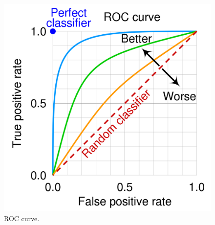 \begin{figure}
    \centering
    \includegraphics[width=\columnwidth]{graphics/ROCcurve.png}
    \caption[ROC curve]{\label{fig:vROC}ROC curve\autocite{Gomede2023}.}
\end{figure}
